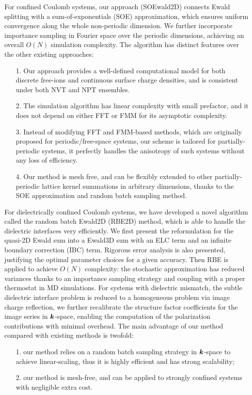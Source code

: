 For confined Coulomb systems, our approach (SOEwald2D) connects Ewald splitting with a sum-of-exponentials (SOE) approximation, which ensures uniform convergence along the whole non-periodic dimension. 
We further incorporate importance sampling in Fourier space over the periodic dimensions, achieving an overall $O(N)$ simulation complexity. 
The algorithm has distinct features over the other existing approaches:
\begin{itemize}
	\item[1.] Our approach provides a well-defined computational model for both discrete free-ions and continuous surface charge densities, and is consistent under both NVT and NPT ensembles.
	\item[2.] The simulation algorithm has linear complexity with small prefactor, and it does not depend on either FFT or FMM for its asymptotic complexity.
	\item[3.] Instead of modifying FFT and FMM-based methods, which are originally proposed for periodic/free-space systems, our scheme is tailored for partially-periodic systems, it perfectly handles the anisotropy of such systems without any loss of efficiency.
	\item[4.] Our method is mesh free, and can be flexibly extended to other partially-periodic lattice kernel summations in arbitrary dimensions, thanks to the SOE approximation and random batch sampling method.
\end{itemize}

For dielectrically confined Coulomb systems, we have developed a novel algorithm called the random batch Ewald2D (RBE2D) method, which is able to handle the dielectric interfaces very efficiently.
We first present the reformulation for the quasi-2D Ewald sum into a Ewald3D sum with an ELC term and an infinite boundary correction (IBC) term. Rigorous error analysis is also presented, justifying the optimal parameter choices for a given accuracy.
Then RBE is applied to achieve $O(N)$ complexity: the stochastic approximation has reduced variances thanks to an importance sampling strategy and coupling with a proper thermostat in MD simulations.
For systems with dielectric mismatch, the subtle dielectric interface problem is reduced to a homogeneous problem via image charge reflection,
we further recalibrate the structure factor coefficients for the image series in $\boldsymbol{k}$-space, 
enabling the computation of the polarization contributions with minimal overhead. 
The main advantage of our method compared with existing methods is twofold: 
\begin{itemize}
	\item[1.] our method relies on a random batch sampling strategy in $\boldsymbol{k}$-space to achieve linear-scaling, thus it is highly efficient and has strong scalability; 
	\item[2.] our method is mesh-free, and can be applied to strongly confined systems with negligible extra cost.
\end{itemize}


